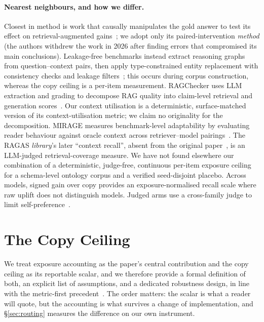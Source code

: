 \documentclass[10pt,twocolumn]{article}
\begin{document}
\paragraph{Nearest neighbours, and how we differ.}
Closest in method is work that causally manipulates the gold answer to test its effect on retrieval-augmented gains~\cite{answerpresence2026}; we adopt only its paired-intervention \emph{method} (the authors withdrew the work in 2026 after finding errors that compromised its main conclusions). Leakage-free benchmarks instead extract reasoning graphs from question--context pairs, then apply type-constrained entity replacement with consistency checks and leakage filters~\cite{seedrg2026}; this occurs during corpus construction, whereas the copy ceiling is a per-item measurement. RAGChecker uses LLM extraction and grading to decompose RAG quality into claim-level retrieval and generation scores~\cite{ragchecker2024}. Our context utilisation is a deterministic, surface-matched version of its context-utilisation metric; we claim no originality for the decomposition. MIRAGE measures benchmark-level adaptability by evaluating reader behaviour against oracle context across retriever--model pairings~\cite{mirage2025}. The RAGAS \emph{library}'s later ``context recall'', absent from the original paper~\cite{es2023ragas}, is an LLM-judged retrieval-coverage measure. We have not found elsewhere our combination of a deterministic, judge-free, continuous per-item exposure ceiling for a schema-level ontology corpus and a verified seed-disjoint placebo. Across models, signed gain over copy provides an exposure-normalised recall scale where raw uplift does not distinguish models. Judged arms use a cross-family judge to limit self-preference~\cite{zheng2023judging,panickssery2024selfpreference}.



\section{The Copy Ceiling}\label{sec:ceiling}
We treat exposure accounting as the paper's central contribution and the copy ceiling as its reportable scalar, and we therefore provide a formal definition of both, an explicit list of assumptions, and a dedicated robustness design, in line with the metric-first precedent~\cite{min2023factscore,gao2023alce}. The order matters: the scalar is what a reader will quote, but the accounting is what survives a change of implementation, and \S\ref{sec:routing} measures the difference on our own instrument.
\end{document}
